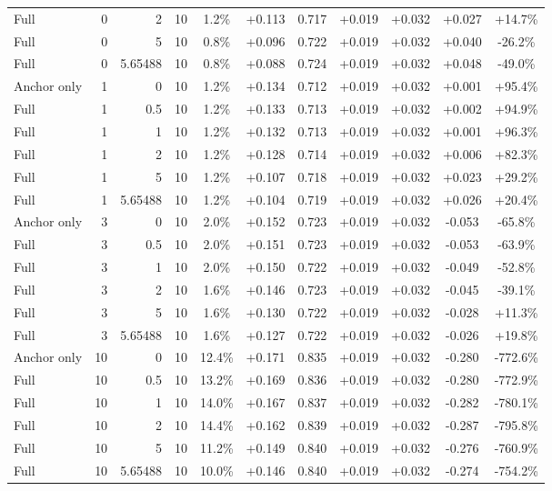 \begin{table}[htbp]
\begin{tabular}{lrrrccccccc}
Full & 0 & 2 & 10 & 1.2\% & +0.113 & 0.717 & +0.019 & +0.032 & +0.027 & +14.7\% \\
Full & 0 & 5 & 10 & 0.8\% & +0.096 & 0.722 & +0.019 & +0.032 & +0.040 & -26.2\% \\
Full & 0 & 5.65488 & 10 & 0.8\% & +0.088 & 0.724 & +0.019 & +0.032 & +0.048 & -49.0\% \\
Anchor only & 1 & 0 & 10 & 1.2\% & +0.134 & 0.712 & +0.019 & +0.032 & +0.001 & +95.4\% \\
Full & 1 & 0.5 & 10 & 1.2\% & +0.133 & 0.713 & +0.019 & +0.032 & +0.002 & +94.9\% \\
Full & 1 & 1 & 10 & 1.2\% & +0.132 & 0.713 & +0.019 & +0.032 & +0.001 & +96.3\% \\
Full & 1 & 2 & 10 & 1.2\% & +0.128 & 0.714 & +0.019 & +0.032 & +0.006 & +82.3\% \\
Full & 1 & 5 & 10 & 1.2\% & +0.107 & 0.718 & +0.019 & +0.032 & +0.023 & +29.2\% \\
Full & 1 & 5.65488 & 10 & 1.2\% & +0.104 & 0.719 & +0.019 & +0.032 & +0.026 & +20.4\% \\
Anchor only & 3 & 0 & 10 & 2.0\% & +0.152 & 0.723 & +0.019 & +0.032 & -0.053 & -65.8\% \\
Full & 3 & 0.5 & 10 & 2.0\% & +0.151 & 0.723 & +0.019 & +0.032 & -0.053 & -63.9\% \\
Full & 3 & 1 & 10 & 2.0\% & +0.150 & 0.722 & +0.019 & +0.032 & -0.049 & -52.8\% \\
Full & 3 & 2 & 10 & 1.6\% & +0.146 & 0.723 & +0.019 & +0.032 & -0.045 & -39.1\% \\
Full & 3 & 5 & 10 & 1.6\% & +0.130 & 0.722 & +0.019 & +0.032 & -0.028 & +11.3\% \\
Full & 3 & 5.65488 & 10 & 1.6\% & +0.127 & 0.722 & +0.019 & +0.032 & -0.026 & +19.8\% \\
Anchor only & 10 & 0 & 10 & 12.4\% & +0.171 & 0.835 & +0.019 & +0.032 & -0.280 & -772.6\% \\
Full & 10 & 0.5 & 10 & 13.2\% & +0.169 & 0.836 & +0.019 & +0.032 & -0.280 & -772.9\% \\
Full & 10 & 1 & 10 & 14.0\% & +0.167 & 0.837 & +0.019 & +0.032 & -0.282 & -780.1\% \\
Full & 10 & 2 & 10 & 14.4\% & +0.162 & 0.839 & +0.019 & +0.032 & -0.287 & -795.8\% \\
Full & 10 & 5 & 10 & 11.2\% & +0.149 & 0.840 & +0.019 & +0.032 & -0.276 & -760.9\% \\
Full & 10 & 5.65488 & 10 & 10.0\% & +0.146 & 0.840 & +0.019 & +0.032 & -0.274 & -754.2\% \\

\end{tabular}
\end{table}
